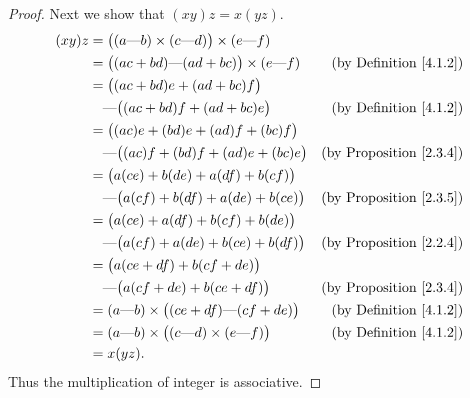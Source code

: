 \begin{proof}
    Next we show that \((xy)z = x(yz)\).
    \begin{align*}
        (xy)z & = \big((a \text{---} b) \times (c \text{---} d)\big) \times (e \text{---} f)                                       \\
              & = \big((ac + bd) \text{---} (ad + bc)\big) \times (e \text{---} f)           & \text{(by Definition \ref{4.1.2})}  \\
              & = \big((ac + bd)e + (ad + bc)f\big)                                                                                \\
              & \quad \text{---} \big((ac + bd)f + (ad + bc)e\big)                           & \text{(by Definition \ref{4.1.2})}  \\
              & = \big((ac)e + (bd)e + (ad)f + (bc)f\big)                                                                          \\
              & \quad \text{---} \big((ac)f + (bd)f + (ad)e + (bc)e\big)                     & \text{(by Proposition \ref{2.3.4})} \\
              & = \big(a(ce) + b(de) + a(df) + b(cf)\big)                                                                          \\
              & \quad \text{---} \big(a(cf) + b(df) + a(de) + b(ce)\big)                     & \text{(by Proposition \ref{2.3.5})} \\
              & = \big(a(ce) + a(df) + b(cf) + b(de)\big)                                                                          \\
              & \quad \text{---} \big(a(cf) + a(de) + b(ce) + b(df)\big)                     & \text{(by Proposition \ref{2.2.4})} \\
              & = \big(a(ce + df) + b(cf + de)\big)                                                                                \\
              & \quad \text{---} \big(a(cf + de) + b(ce + df)\big)                           & \text{(by Proposition \ref{2.3.4})} \\
              & = (a \text{---} b) \times \big((ce + df) \text{---} (cf + de)\big)           & \text{(by Definition \ref{4.1.2})}  \\
              & = (a \text{---} b) \times \big((c \text{---} d) \times (e \text{---} f)\big) & \text{(by Definition \ref{4.1.2})}  \\
              & = x(yz).
    \end{align*}
    Thus the multiplication of integer is associative.


\end{proof}
